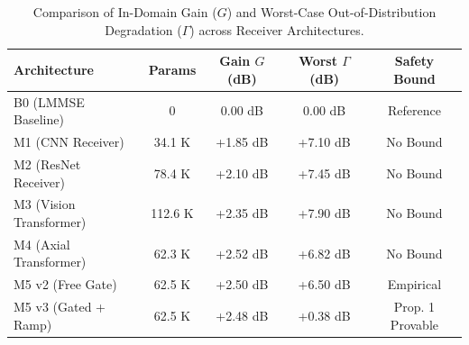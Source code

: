 \begin{table}[t]
\centering
\caption{Comparison of In-Domain Gain ($G$) and Worst-Case Out-of-Distribution Degradation ($\Gamma$) across Receiver Architectures.}
\label{tab:gain_degradation}
\begin{tabular}{lcccc}
\hline
\textbf{Architecture} & \textbf{Params} & \textbf{Gain $G$ (dB)} & \textbf{Worst $\Gamma$ (dB)} & \textbf{Safety Bound} \\
\hline
B0 (LMMSE Baseline) & 0 & 0.00 dB & 0.00 dB & Reference \\
M1 (CNN Receiver) & 34.1 K & +1.85 dB & +7.10 dB & No Bound \\
M2 (ResNet Receiver) & 78.4 K & +2.10 dB & +7.45 dB & No Bound \\
M3 (Vision Transformer) & 112.6 K & +2.35 dB & +7.90 dB & No Bound \\
M4 (Axial Transformer) & 62.3 K & +2.52 dB & +6.82 dB & No Bound \\
M5 v2 (Free Gate) & 62.5 K & +2.50 dB & +6.50 dB & Empirical \\
M5 v3 (Gated + Ramp) & 62.5 K & +2.48 dB & +0.38 dB & Prop. 1 Provable \\
\hline
\end{tabular}
\end{table}
